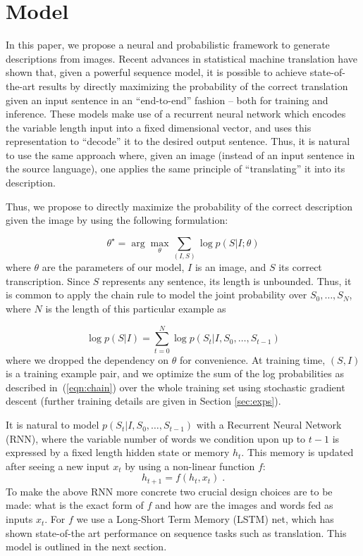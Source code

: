 \section{Model}
\label{sec:model}

In this paper, we propose a neural and probabilistic framework to generate
descriptions from images. Recent advances in statistical machine
translation have shown that, given a powerful sequence model, it is
possible to achieve state-of-the-art results by directly maximizing
the probability of the correct translation given an input sentence in
an ``end-to-end'' fashion -- both for training and inference. These
models make use of a recurrent neural network
which encodes the variable length input into a fixed dimensional
vector, and uses this representation to ``decode'' it to the desired
output sentence. Thus, it is natural to use the same approach where,
given an image (instead of an input sentence in the source language),
one applies the same principle of ``translating'' it into its
description.

Thus, we propose to directly maximize the probability of the correct
description given the image by using the following formulation:

\begin{equation}
\theta^\star = \arg\max_\theta \sum_{(I,S)} \log p(S | I ; \theta)
\label{eqn:obj}
\end{equation}
where $\theta$ are the parameters of our model, $I$ is an image, and
$S$ its correct transcription. Since $S$ represents any sentence, its
length is unbounded. Thus, it is common to apply the chain rule to
model the joint probability over $S_0,\ldots,S_N$, where $N$ is the
length of this particular example as

\begin{equation}
\log p(S | I) = \sum_{t=0}^N \log p(S_t | I, S_0, \ldots, S_{t-1})
\label{eqn:chain}
\end{equation}
where we dropped the dependency on $\theta$ for convenience.
At training
time, $(S,I)$ is a training example pair, and we optimize the sum of
the log probabilities as described in~(\ref{eqn:chain}) over the
whole training set using stochastic gradient descent (further training
details are given in Section \ref{sec:exps}).

It is natural to model $p(S_t | I, S_0, \ldots, S_{t-1})$ with a
Recurrent Neural Network (RNN), where the variable number of 
words we condition upon up to $t-1$ is expressed by a fixed length 
hidden state or memory $h_t$. This memory is updated after seeing a
new input $x_t$  by using a non-linear function $f$:
\begin{equation}\label{eq:rnn}
h_{t+1} = f(h_{t}, x_t)\;.
\end{equation}
To make the above RNN more concrete two crucial design choices are to be made: what is
the exact form of $f$ and how are the images and words fed as inputs $x_t$. For 
$f$ we use a Long-Short Term Memory (LSTM) net, which has shown state-of-the art
performance on sequence tasks such as translation. This model is outlined in the
next section. 

